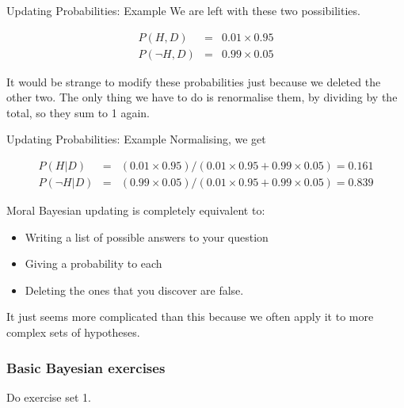 \documentclass{beamer}
\begin{document}
\begin{frame}[t]{Updating Probabilities: Example}
We are left with these two possibilities.

\begin{eqnarray*}
P(H, D) &=& 0.01 \times 0.95\\
P(\neg H, D) &=& 0.99 \times 0.05
\end{eqnarray*}

It would be strange to modify these probabilities just because we deleted the
other two. The only thing we have to do is renormalise them, by dividing by the total, so they sum to 1 again.
\end{frame}

\begin{frame}[t]{Updating Probabilities: Example}
Normalising, we get

\begin{eqnarray*}
P(H | D) &=& (0.01 \times 0.95)/(0.01 \times 0.95 + 0.99\times0.05) = 0.161\\
P(\neg H | D) &=& (0.99 \times 0.05)/(0.01 \times 0.95 + 0.99\times0.05) = 0.839
\end{eqnarray*}
\end{frame}

\begin{frame}[t]{Moral}
Bayesian updating is completely equivalent to:
\begin{itemize}
\item Writing a list of possible answers to your question
\item Giving a probability to each
\item Deleting the ones that you discover are false.
\end{itemize}

It just seems more complicated than this because we often apply it to more
complex sets of hypotheses.
\end{frame}


\begin{frame}
\frametitle{Basic Bayesian exercises}

Do exercise set 1.

\end{frame}
\end{document}
